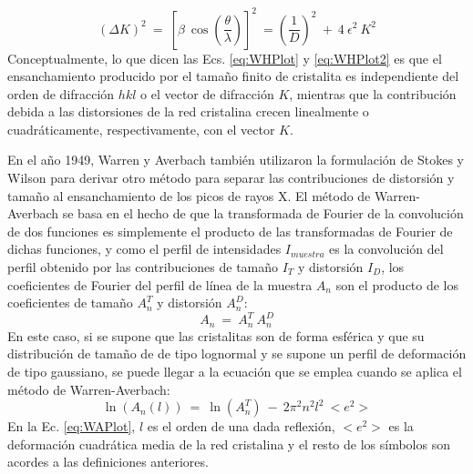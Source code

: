  \begin{equation}
  (\Delta K)^2 \ = \ \left[\beta \ \cos\left(\frac{\theta}{\lambda}\right)\right]^2 \ = \left(\frac{1}{D}\right)^2 \ + \ 4 \ \epsilon^2 \ K^2
  \label{eq:WHPlot2}
\end{equation}
\noindent
Conceptualmente, lo que dicen las Ecs. \ref{eq:WHPlot} y \ref{eq:WHPlot2} es que el ensanchamiento producido por el tamaño finito de cristalita es independiente del orden de difracción $hkl$ o el vector de difracción $K$, mientras que la contribución debida a las  distorsiones de la red cristalina crecen linealmente o cuadráticamente, respectivamente, con el vector $K$.

En el año 1949, Warren y Averbach\cite{WarrenAverbach1949} también utilizaron la formulación de Stokes y Wilson para derivar otro método para separar las contribuciones de distorsión y tamaño al ensanchamiento de los picos de rayos X. 
El método de Warren-Averbach se basa en el hecho de que la transformada de Fourier de la convolución de dos funciones es simplemente el producto de las transformadas de Fourier de dichas funciones, y como el perfil de intensidades $I_{muestra}$ es la convolución del perfil obtenido por las contribuciones de tamaño $I_{T}$ y distorsión $I_{D}$, los coeficientes de Fourier del perfil de línea de la muestra $A_n$ son el producto de los coeficientes de tamaño $A_n^T$ y distorsión $A_n^D$:
\begin{equation}
  A_n \ = \ A_n^T \ A_n^D
  \label{eq:FCoeff}
 \end{equation}
\noindent
En este caso, si se supone que las cristalitas son de forma esférica y que su distribución de tamaño de de tipo lognormal\cite{WikiLognormal} y se supone un perfil de deformación de tipo gaussiano, se puede llegar a la ecuación que se emplea cuando se aplica el método de Warren-Averbach:
\begin{equation}
  \ln(A_n(l)) \ = \ \ln(A_n^T) \ - \ 2 \pi^2 n^2 l^2 \ <e^2>
  \label{eq:WAPlot}
 \end{equation}
\noindent
En la Ec. \ref{eq:WAPlot}, $l$ es el orden de una dada reflexión, $<e^2>$ es la deformación cuadrática media de la red cristalina y el resto de los símbolos son acordes a las definiciones anteriores.


